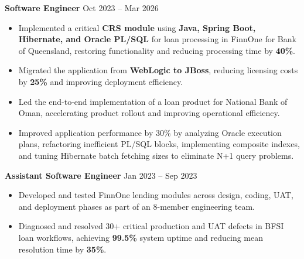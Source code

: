 \documentclass[a4paper,10pt]{article}
\begin{document}
\textbf{Software Engineer} \hfill Oct 2023 -- Mar 2026
\begin{itemize}[leftmargin=*]
\vspace{-4pt}

\item Implemented a critical \textbf{CRS module} using \textbf{Java, Spring Boot, Hibernate, and Oracle PL/SQL} for loan processing in FinnOne for Bank of Queensland, restoring functionality and reducing processing time by \textbf{40\%}.
\vspace{-5pt}
\item Migrated the application from \textbf{WebLogic to JBoss}, reducing licensing costs by \textbf{25\%} and improving deployment efficiency.
\vspace{-5pt}
\item Led the end-to-end implementation of a loan product for National Bank of Oman, accelerating product rollout and improving operational efficiency.
\vspace{-5pt}
\item Improved application performance by 30\% by analyzing Oracle execution plans, refactoring inefficient PL/SQL blocks, implementing composite indexes, and tuning Hibernate batch fetching sizes to eliminate N+1 query problems.
\vspace{-5pt}
\vspace{5pt}
\end{itemize}

\vspace{-3pt}
\textbf{Assistant Software Engineer} \hfill Jan 2023 -- Sep 2023

\begin{itemize}[leftmargin=*]
\vspace{-4pt}
\item Developed and tested FinnOne lending modules across design, coding, UAT, and deployment phases as part of an 8-member engineering team.
\vspace{-5pt}
\item Diagnosed and resolved 30+ critical production and UAT defects in BFSI loan workflows, achieving \textbf{99.5\%} system uptime and reducing mean resolution time by \textbf{35\%}.
\end{itemize}

\vspace{-18pt}
\end{document}
